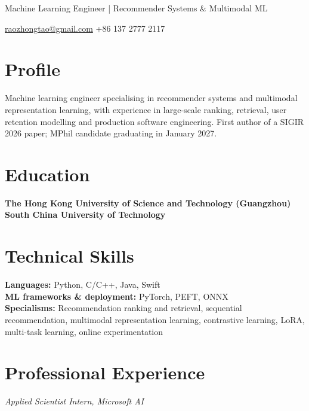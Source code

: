 \documentclass{resume}
\renewcommand{\contactInfo}[4]{%
  \centerline{\rmfamily\normalsize
    #1 \quad\textperiodcentered\quad #2%
    \ifthenelse{\isempty{#3}}{}{\quad\textperiodcentered\quad #3}%
    \ifthenelse{\isempty{#4}}{}{\quad\textperiodcentered\quad #4}%
  }
  \vspace{0.7ex}
}
\begin{document}

\centerline{\large Machine Learning Engineer | Recommender Systems \& Multimodal ML}
\vspace{0.7ex}
\contactInfo{\href{mailto:raozhongtao@gmail.com}{raozhongtao@gmail.com}}{+86 137 2777 2117}{}{}

\section{Profile}
Machine learning engineer specialising in recommender systems and multimodal representation learning, with experience in large-scale ranking, retrieval, user retention modelling and production software engineering. First author of a SIGIR 2026 paper; MPhil candidate graduating in January 2027.

\section{Education}
\textbf{The Hong Kong University of Science and Technology (Guangzhou)}
\vspace{0.4em}
\textbf{South China University of Technology}

\section{Technical Skills}
\textbf{Languages:} Python, C/C++, Java, Swift\\
\textbf{ML frameworks \& deployment:} PyTorch, PEFT, ONNX\\
\textbf{Specialisms:} Recommendation ranking and retrieval, sequential recommendation, multimodal representation learning, contrastive learning, LoRA, multi-task learning, online experimentation

\section{Professional Experience}
\textit{Applied Scientist Intern, Microsoft AI}
\end{document}
